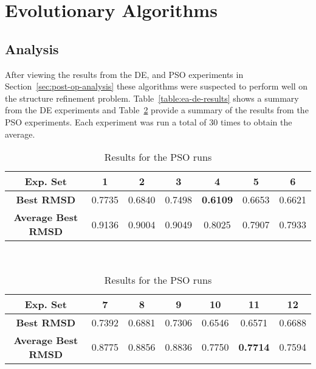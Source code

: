 \section{Evolutionary Algorithms}

\subsection{Analysis}

After viewing the results from the DE, and PSO experiments in Section~\ref{sec:post-op-analysis} these algorithms were suspected to perform well on the structure refinement problem. Table~\ref{table:ea-de-results} shows a summary from the DE experiments and Table~\ref{table:ea-pso-results} provide a summary of the results from the PSO experiments. Each experiment was run a total of 30 times to obtain the average.

\begin{table}
	\centering
	\begin{tabular}{ | >{\bfseries}c | c | c | c | c | c | c | }
		\hline
		Exp. Set & 1 & 2 & 3 & 4 & 5 & 6 \\ \hline
		Best RMSD & 0.7735 & 0.6840 & 0.7498 & \textbf{0.6109} & 0.6653 & 0.6621 \\ \hline
		Average Best RMSD & 0.9136 & 0.9004 & 0.9049 & 0.8025 & 0.7907 & 0.7933 \\ \hline
	\end{tabular}
	\\
	\vspace{3 mm}
	\begin{tabular}{ | >{\bfseries}c | c | c | c | c | c | c | }
		\hline
		Exp. Set & 7 & 8 & 9 & 10 & 11 & 12 \\ \hline
		Best RMSD & 0.7392 & 0.6881 & 0.7306 & 0.6546 & 0.6571 & 0.6688 \\ \hline
		Average Best RMSD & 0.8775 & 0.8856 & 0.8836 & 0.7750 & \textbf{0.7714} & 0.7594 \\ \hline
	\end{tabular}
	\caption{Results for the PSO runs}
	\label{table:ea-pso-results}
\end{table}

